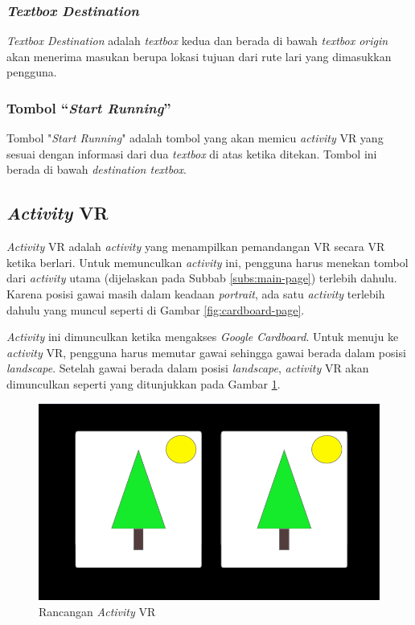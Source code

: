 \subsubsection{\textit{Textbox Destination}}
\textit{Textbox Destination} adalah \textit{textbox} kedua dan berada di bawah \textit{textbox origin}  akan menerima masukan berupa lokasi tujuan dari rute lari yang dimasukkan pengguna.   

\subsubsection{Tombol ``\textit{Start Running}''}
Tombol "\textit{Start Running}" adalah tombol yang akan memicu \textit{activity} VR yang sesuai dengan informasi dari dua \textit{textbox} di atas ketika ditekan. Tombol ini berada di bawah \textit{destination textbox}.

\subsection{\textit{Activity} VR}
\textit{Activity} VR adalah \textit{activity} yang menampilkan pemandangan VR secara VR ketika berlari. Untuk memunculkan \textit{activity} ini, pengguna harus menekan tombol dari \textit{activity} utama (dijelaskan pada Subbab \ref{subs:main-page}) terlebih dahulu. Karena posisi gawai masih dalam keadaan \textit{portrait}, ada satu \textit{activity} terlebih dahulu yang muncul seperti di Gambar \ref{fig:cardboard-page}. 

\textit{Activity} ini dimunculkan ketika mengakses \textit{Google Cardboard}. Untuk menuju ke \textit{activity} VR, pengguna harus memutar gawai sehingga gawai berada dalam posisi \textit{landscape}. Setelah gawai berada dalam posisi \textit{landscape}, \textit{activity} VR akan dimunculkan seperti yang ditunjukkan pada Gambar \ref{fig:vr-page}.

\begin{figure}[h]
	\centering
		\includegraphics[scale=0.7]{Gambar/mockup-vr-page.png}
	\caption{Rancangan \textit{Activity} VR}
	\label{fig:vr-page}
\end{figure}

